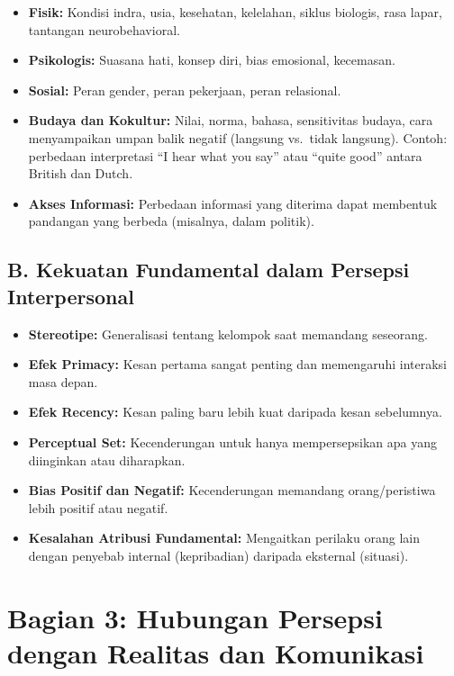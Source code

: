 \documentclass[
  letterpaper,
  DIV=11,
  numbers=noendperiod]{scrreprt}
\providecommand{\tightlist}{%
  \setlength{\itemsep}{0pt}\setlength{\parskip}{0pt}}
\begin{document}
\begin{itemize}
\tightlist
\item
  \textbf{Fisik:} Kondisi indra, usia, kesehatan, kelelahan, siklus
  biologis, rasa lapar, tantangan neurobehavioral.
\item
  \textbf{Psikologis:} Suasana hati, konsep diri, bias emosional,
  kecemasan.
\item
  \textbf{Sosial:} Peran gender, peran pekerjaan, peran relasional.
\item
  \textbf{Budaya dan Kokultur:} Nilai, norma, bahasa, sensitivitas
  budaya, cara menyampaikan umpan balik negatif (langsung vs.~tidak
  langsung). Contoh: perbedaan interpretasi ``I hear what you say'' atau
  ``quite good'' antara British dan Dutch.
\item
  \textbf{Akses Informasi:} Perbedaan informasi yang diterima dapat
  membentuk pandangan yang berbeda (misalnya, dalam politik).
\end{itemize}

\subsection{B. Kekuatan Fundamental dalam Persepsi
Interpersonal}\label{b.-kekuatan-fundamental-dalam-persepsi-interpersonal}

\begin{itemize}
\tightlist
\item
  \textbf{Stereotipe:} Generalisasi tentang kelompok saat memandang
  seseorang.
\item
  \textbf{Efek Primacy:} Kesan pertama sangat penting dan memengaruhi
  interaksi masa depan.
\item
  \textbf{Efek Recency:} Kesan paling baru lebih kuat daripada kesan
  sebelumnya.
\item
  \textbf{Perceptual Set:} Kecenderungan untuk hanya mempersepsikan apa
  yang diinginkan atau diharapkan.
\item
  \textbf{Bias Positif dan Negatif:} Kecenderungan memandang
  orang/peristiwa lebih positif atau negatif.
\item
  \textbf{Kesalahan Atribusi Fundamental:} Mengaitkan perilaku orang
  lain dengan penyebab internal (kepribadian) daripada eksternal
  (situasi).
\end{itemize}

\section{Bagian 3: Hubungan Persepsi dengan Realitas dan
Komunikasi}\label{bagian-3-hubungan-persepsi-dengan-realitas-dan-komunikasi}
\end{document}
